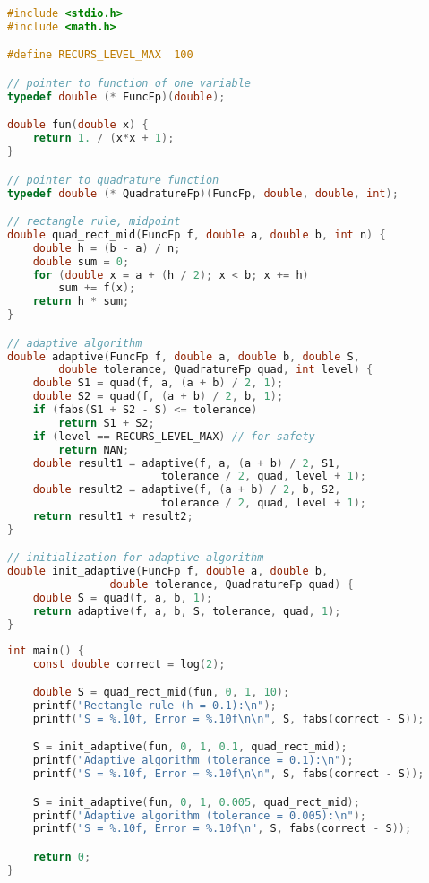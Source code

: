 \documentclass{article}
\begin{document}
\begin{lstlisting}[language=C]
#include <stdio.h>
#include <math.h>

#define RECURS_LEVEL_MAX  100

// pointer to function of one variable
typedef double (* FuncFp)(double);

double fun(double x) {
    return 1. / (x*x + 1);
}

// pointer to quadrature function
typedef double (* QuadratureFp)(FuncFp, double, double, int);

// rectangle rule, midpoint
double quad_rect_mid(FuncFp f, double a, double b, int n) {
    double h = (b - a) / n;
    double sum = 0;
    for (double x = a + (h / 2); x < b; x += h)
        sum += f(x);
    return h * sum;
}

// adaptive algorithm
double adaptive(FuncFp f, double a, double b, double S,
        double tolerance, QuadratureFp quad, int level) {
    double S1 = quad(f, a, (a + b) / 2, 1);
    double S2 = quad(f, (a + b) / 2, b, 1);
    if (fabs(S1 + S2 - S) <= tolerance)
        return S1 + S2;
    if (level == RECURS_LEVEL_MAX) // for safety
        return NAN;
    double result1 = adaptive(f, a, (a + b) / 2, S1,
                        tolerance / 2, quad, level + 1);
    double result2 = adaptive(f, (a + b) / 2, b, S2,
                        tolerance / 2, quad, level + 1);
    return result1 + result2;
}

// initialization for adaptive algorithm
double init_adaptive(FuncFp f, double a, double b,
                double tolerance, QuadratureFp quad) {
    double S = quad(f, a, b, 1);
    return adaptive(f, a, b, S, tolerance, quad, 1);
}
\end{lstlisting}

\newpage

\begin{lstlisting}[language=C, firstnumber=48]
int main() {
    const double correct = log(2);

    double S = quad_rect_mid(fun, 0, 1, 10);
    printf("Rectangle rule (h = 0.1):\n");
    printf("S = %.10f, Error = %.10f\n\n", S, fabs(correct - S));

    S = init_adaptive(fun, 0, 1, 0.1, quad_rect_mid);
    printf("Adaptive algorithm (tolerance = 0.1):\n");
    printf("S = %.10f, Error = %.10f\n\n", S, fabs(correct - S));

    S = init_adaptive(fun, 0, 1, 0.005, quad_rect_mid);
    printf("Adaptive algorithm (tolerance = 0.005):\n");
    printf("S = %.10f, Error = %.10f\n", S, fabs(correct - S));

    return 0;
}
\end{lstlisting}
\end{document}
